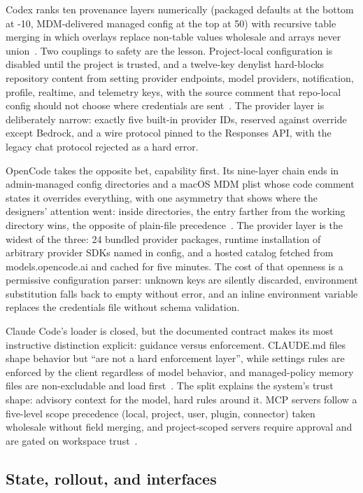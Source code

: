 \documentclass{article}
\newcommand{\codex}[0]{Codex}
\newcommand{\occ}[0]{OpenCode}
\newcommand{\ccc}[0]{Claude Code}
\begin{document}
\codex{} ranks ten provenance layers numerically (packaged defaults at
the bottom at -10, MDM-delivered managed config at the top at 50) with
recursive table merging in which overlays replace non-table values
wholesale and arrays never union~\citep{codexRepo}. Two couplings to
safety are the lesson. Project-local configuration is disabled until the
project is trusted, and a twelve-key denylist hard-blocks repository
content from setting provider endpoints, model providers, notification,
profile, realtime, and telemetry keys, with the source comment that
repo-local config should not choose where credentials are
sent~\citep{codexRepo}. The provider layer is deliberately narrow:
exactly five built-in provider IDs, reserved against override except
Bedrock, and a wire protocol pinned to the Responses API, with the legacy
chat protocol rejected as a hard error.

\occ{} takes the opposite bet, capability first. Its nine-layer chain
ends in admin-managed config directories and a macOS MDM plist whose code
comment states it overrides everything, with one asymmetry that shows
where the designers' attention went: inside  directories,
the entry farther from the working directory wins, the opposite of
plain-file precedence~\citep{opencodeRepo}. The provider layer is the
widest of the three: 24 bundled provider packages, runtime installation
of arbitrary provider SDKs named in config, and a hosted catalog fetched
from models.opencode.ai and cached for five minutes. The cost of that
openness is a permissive configuration parser: unknown keys are silently
discarded, environment substitution falls back to empty without error,
and an inline environment variable replaces the credentials file without
schema validation.

\ccc{}'s loader is closed, but the documented contract makes its most
instructive distinction explicit: guidance versus enforcement. CLAUDE.md
files shape behavior but ``are not a hard enforcement layer'', while
settings rules are enforced by the client regardless of model behavior,
and managed-policy memory files are non-excludable and load
first~\citep{claudeCodeMemoryDocs}. The split explains the system's trust
shape: advisory context for the model, hard rules around it. MCP servers
follow a five-level scope precedence (local, project, user, plugin,
connector) taken wholesale without field merging, and project-scoped
 servers require approval and are gated on workspace
trust~\citep{claudeCodeMcpDocs}.

\subsection{State, rollout, and interfaces}
\label{sec:state}
\end{document}
